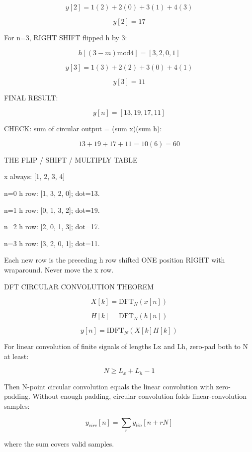 $$y[2]=1(2)+2(0)+3(1)+4(3)$$

$$y[2]=17$$

For n=3, RIGHT SHIFT flipped h by 3:

$$h[(3-m)\text{mod}4]=[3,2,0,1]$$

$$y[3]=1(3)+2(2)+3(0)+4(1)$$

$$y[3]=11$$

FINAL RESULT:

$$y[n]=[13,19,17,11]$$

CHECK: sum of circular output = (sum x)(sum h):

$$13+19+17+11=10(6)=60$$

THE FLIP / SHIFT / MULTIPLY TABLE

x always: [1, 2, 3, 4]

n=0 h row: [1, 3, 2, 0]; dot=13.

n=1 h row: [0, 1, 3, 2]; dot=19.

n=2 h row: [2, 0, 1, 3]; dot=17.

n=3 h row: [3, 2, 0, 1]; dot=11.

Each new row is the preceding h row shifted ONE position RIGHT with wraparound. Never move the x row.

DFT CIRCULAR CONVOLUTION THEOREM

$$X[k]=\text{DFT}_N(x[n])$$

$$H[k]=\text{DFT}_N(h[n])$$

$$y[n]=\text{IDFT}_N(X[k]H[k])$$

For linear convolution of finite signals of lengths Lx and Lh, zero-pad both to N at least:

$$N\ge L_x+L_h-1$$

Then N-point circular convolution equals the linear convolution with zero-padding. Without enough padding, circular convolution folds linear-convolution samples:

$$y_{circ}[n]=\sum_r y_{lin}[n+rN]$$

where the sum covers valid samples.
